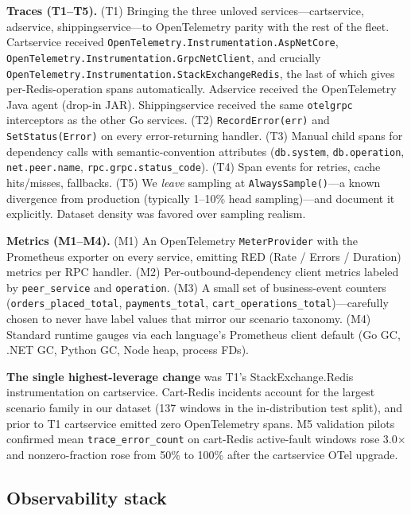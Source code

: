 \textbf{Traces (T1--T5).} (T1) Bringing the three unloved services---cartservice, adservice, shippingservice---to OpenTelemetry parity with the rest of the fleet. Cartservice received \texttt{OpenTelemetry.Instrumentation.AspNetCore}, \texttt{OpenTelemetry.Instrumentation.GrpcNetClient}, and crucially \texttt{OpenTelemetry.Instrumentation.StackExchangeRedis}, the last of which gives per-Redis-operation spans automatically. Adservice received the OpenTelemetry Java agent (drop-in JAR). Shippingservice received the same \texttt{otelgrpc} interceptors as the other Go services. (T2) \texttt{RecordError(err)} and \texttt{SetStatus(Error)} on every error-returning handler. (T3) Manual child spans for dependency calls with semantic-convention attributes (\texttt{db.system}, \texttt{db.operation}, \texttt{net.peer.name}, \texttt{rpc.grpc.status\_code}). (T4) Span events for retries, cache hits/misses, fallbacks. (T5) We \emph{leave} sampling at \texttt{AlwaysSample()}---a known divergence from production (typically 1--10\% head sampling)---and document it explicitly. Dataset density was favored over sampling realism.

\textbf{Metrics (M1--M4).} (M1) An OpenTelemetry \texttt{MeterProvider} with the Prometheus exporter on every service, emitting RED (Rate / Errors / Duration) metrics per RPC handler. (M2) Per-outbound-dependency client metrics labeled by \texttt{peer\_service} and \texttt{operation}. (M3) A small set of business-event counters (\texttt{orders\_placed\_total}, \texttt{payments\_total}, \texttt{cart\_operations\_total})---carefully chosen to never have label values that mirror our scenario taxonomy. (M4) Standard runtime gauges via each language's Prometheus client default (Go GC, .NET GC, Python GC, Node heap, process FDs).

\textbf{The single highest-leverage change} was T1's StackExchange.Redis instrumentation on cartservice. Cart-Redis incidents account for the largest scenario family in our dataset (137 windows in the in-distribution test split), and prior to T1 cartservice emitted zero OpenTelemetry spans. M5 validation pilots confirmed mean \texttt{trace\_error\_count} on cart-Redis active-fault windows rose 3.0$\times$ and nonzero-fraction rose from 50\% to 100\% after the cartservice OTel upgrade.

\subsection{Observability stack}

